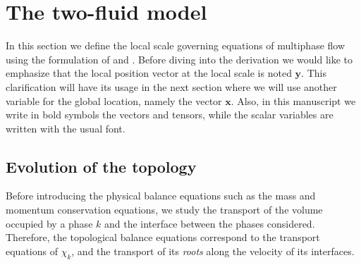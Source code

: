 
\section{The  two-fluid model}
\label{sec:conservation_laws}

In this section we define the local scale governing equations of multiphase flow using the formulation of \citet{kataoka1986local} and \citet{drew1983mathematical}.
Before diving into the derivation we would like to emphasize that the local position vector at the local scale is noted $\textbf{y}$.
This clarification will have its usage in the next section where we will use another variable for the global location, namely the vector $\textbf{x}$.
Also, in this manuscript we write in bold symbols the vectors and tensors, while the scalar variables are written with the usual font.



\subsection{Evolution of the topology}

Before introducing the physical balance equations such as the mass and momentum conservation equations, we study the transport of the volume occupied by a phase $k$ and the interface between the phases considered.
Therefore, the topological balance equations correspond to the transport equations of $\chi_k$, and the transport of its \textit{roots} along the velocity of its interfaces.

